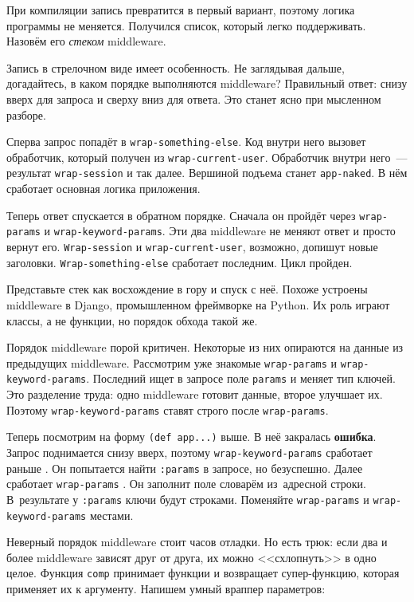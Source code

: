 
При компиляции запись превратится в первый вариант, поэтому логика программы не
меняется. Получился список, который легко поддерживать. Назовём его
\emph{стеком} middleware.

Запись в стрелочном виде имеет особенность. Не заглядывая дальше, догадайтесь, в
каком порядке выполняются middleware? Правильный ответ: снизу вверх для запроса
и сверху вниз для ответа. Это станет ясно при мысленном разборе.


Сперва запрос попадёт в \verb|wrap-something-else|. Код внутри него
вызовет обработчик, который получен из \verb|wrap-current-user|. Обработчик
внутри него~--- результат \verb|wrap-session| и так далее. Вершиной подъема
станет \verb|app-naked|. В нём сработает основная логика приложения.

Теперь ответ спускается в обратном порядке. Сначала он пройдёт через
\verb|wrap-params| и \verb|wrap-keyword-params|. Эти два middleware не
меняют ответ и просто вернут его. \verb|Wrap-session| и
\verb|wrap-current-user|, возможно, допишут новые заголовки.
\verb|Wrap-something-else| сработает последним. Цикл пройден.


Представьте стек как восхождение в гору и спуск с неё. Похоже устроены
middleware в Django, промышленном фреймворке на Python. Их роль играют классы, а
не функции, но порядок обхода такой же.

Порядок middleware порой критичен. Некоторые из них опираются на данные из
предыдущих middleware. Рассмотрим уже знакомые \verb|wrap-params| и
\verb|wrap-keyword-params|. Последний ищет в запросе поле \verb|params| и
меняет тип ключей. Это разделение труда: одно middleware готовит данные, второе
улучшает их. Поэтому \verb|wrap-keyword-params| ставят строго после
\verb|wrap-params|.


Теперь посмотрим на форму \verb|(def app...)| выше. В неё закралась
\textbf{ошибка}. Запрос поднимается снизу вверх, поэтому
\verb|wrap-keyword-params| сработает раньше . Он попытается найти
\verb|:params| в запросе, но безуспешно. Далее сработает \verb|wrap-params|
. Он заполнит поле словарём из~адресной строки. В~результате у
\verb|:params| ключи будут строками. Поменяйте \verb|wrap-params| и
\verb|wrap-keyword-params| местами.

Неверный порядок middleware стоит часов отладки. Но есть трюк: если два и более
middleware зависят друг от друга, их можно <<схлопнуть>> в одно целое. Функция
\verb|comp| принимает функции и возвращает супер-функцию, которая применяет их
к аргументу. Напишем умный враппер параметров:

